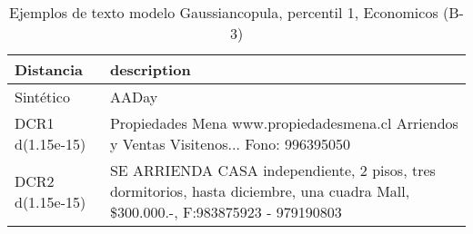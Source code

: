 \begin{table}[H]
\centering
\fontsize{10}{14}\selectfont
\caption{Ejemplos de texto modelo Gaussiancopula, percentil 1, Economicos (B-3)}
\label{table-example-economicos-b-3-gaussiancopula-1p-text}
\begin{tabular}{|l|m{35em}|}
\hline
\rowcolor[gray]{0.8}
Distancia & description \\
\hline Sintético & AADay \\
\hline DCR1 d(1.15e-15) & Propiedades Mena www.propiedadesmena.cl Arriendos y Ventas Visitenos... Fono: 996395050 \\
\hline DCR2 d(1.15e-15) & SE ARRIENDA CASA independiente, 2 pisos, tres dormitorios, hasta diciembre, una cuadra Mall, \$300.000.-, F:983875923 - 979190803 \\
\hline
\end{tabular}
\end{table}
